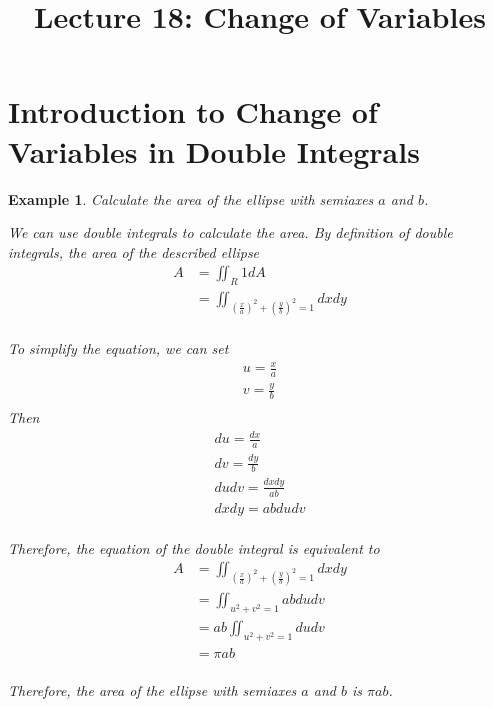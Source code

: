 \documentclass{article}
\title{Lecture 18: Change of Variables}
\author{}
\date{}
\newtheorem{example}{Example}
\begin{document}
    
\maketitle

\section{Introduction to Change of Variables in Double Integrals}

\begin{example}
  Calculate the area of the ellipse with semiaxes $a$ and $b$.

  We can use double integrals to calculate the area. By definition of double 
  integrals, the area of the described ellipse 
  \begin{equation*}
    \begin{split}
      A &= \iint_R 1 dA \\
        &= \iint_{(\frac{x}{a})^2 + (\frac{y}{b})^2 = 1} dx dy \\
    \end{split}
  \end{equation*}
  
  To simplify the equation, we can set
  \begin{gather*}
    u = \frac{x}{a} \\
    v = \frac{y}{b} \\
  \end{gather*}
  Then
  \begin{gather*}
    du = \frac{dx}{a} \\
    dv = \frac{dy}{b} \\
    du dv = \frac{dx dy}{ab} \\
    dx dy = ab du dv \\
  \end{gather*}
  
  Therefore, the equation of the double integral is equivalent to
  \begin{equation*}
    \begin{split}
      A &= \iint_{(\frac{x}{a})^2 + (\frac{y}{b})^2 = 1} dx dy \\
        &= \iint_{u^2 + v^2 = 1} ab du dv \\
        &= ab \iint_{u^2 + v^2 = 1} du dv \\
        &= \pi ab \\
    \end{split}
  \end{equation*}

  Therefore, the area of the ellipse with semiaxes $a$ and $b$ is $\pi ab$.
\end{example}
\end{document}
